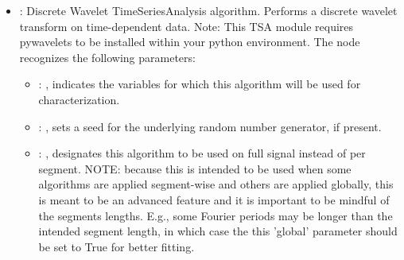\begin{itemize}
    \item {}:
      Discrete Wavelet TimeSeriesAnalysis algorithm. Performs a discrete wavelet transform
      on time-dependent data. Note: This TSA module requires pywavelets to be installed within your
      python environment.
      The  node recognizes the following parameters:
        \begin{itemize}
          \item {}: , 
            indicates the variables for which this algorithm will be used for characterization.
          \item {}: , 
            sets a seed for the underlying random number generator, if present.
          \item {}: , 
            designates this algorithm to be used on full signal instead of per
            segment. NOTE: because this is intended to be used when some algorithms are
            applied segment-wise and others are applied globally, this is meant to be an
            advanced feature and it is important to be mindful of the segments lengths.
            E.g., some Fourier periods may be longer than the intended segment length, in
            which case the this 'global' parameter should be set to True for better
            fitting. 
      \end{itemize}


\end{itemize}
